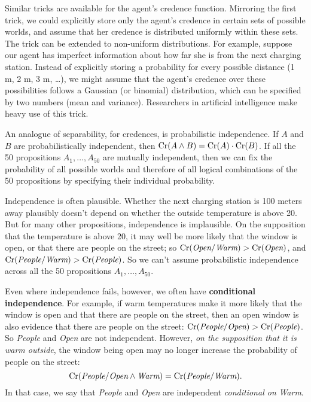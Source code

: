 Similar tricks are available for the agent's credence
function. Mirroring the first trick, we could explicitly store only
the agent's credence in certain sets of possible worlds, and assume
that her credence is distributed uniformly within these sets. The
trick can be extended to non-uniform distributions. For example,
suppose our agent has imperfect information about how far she is from
the next charging station. Instead of explicitly storing a probability
for every possible distance (1 m, 2 m, 3 m, \ldots), we might assume
that the agent's credence over these possibilities follows a Gaussian
(or binomial) distribution, which can be specified by two numbers
(mean and variance). Researchers in artificial intelligence make heavy
use of this trick.

An analogue of separability, for credences, is probabilistic
independence. If $A$ and $B$ are probabilistically independent, then
$\text{Cr}(A\land B) = \text{Cr}(A) \cdot \text{Cr}(B)$. If all the 50 propositions
$A_1,\ldots,A_{50}$ are mutually independent, then we can fix the
probability of all possible worlds and therefore of all logical
combinations of the 50 propositions by specifying their individual
probability.

Independence is often plausible. Whether the next charging station is
100 meters away plausibly doesn't depend on whether the outside
temperature is above 20\celsius. But for many other propositions,
independence is implausible. On the supposition that the temperature
is above 20\celsius, it may well be more likely that the window is
open, or that there are people on the street; so
$\text{Cr}(\emph{Open}/\emph{Warm}) > \text{Cr}(\emph{Open})$, and
$\text{Cr}(\emph{People}/\emph{Warm}) > \text{Cr}(\emph{People})$. So we can't
assume probabilistic independence across all the 50 propositions
$A_1,\ldots,A_{50}$.

Even where independence fails, however, we often have
\textbf{conditional independence}. For example, if warm temperatures
make it more likely that the window is open and that there are people
on the street, then an open window is also evidence that there are
people on the street: $\text{Cr}(\emph{People}/\emph{Open}) >
\text{Cr}(\emph{People})$.  So \emph{People} and \emph{Open} are not
independent. However, \emph{on the supposition that it is warm
  outside}, the window being open may no longer increase the
probability of people on the street:
\[
\text{Cr}(\emph{People}/\emph{Open} \land \emph{Warm}) = \text{Cr}(\emph{People}/
\emph{Warm}).
\]
In that case, we say that \emph{People} and \emph{Open} are
independent \emph{conditional on} \emph{Warm}.

